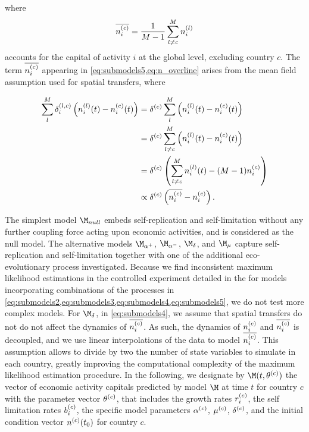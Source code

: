 where 
\begin{equation}\label{eq:n_overline}
      \overline{n_i^{(c)} } = \frac{1}{M-1} \sum_{l \neq c}^M n_{i}^{(l)}
\end{equation}
accounts for the capital of activity $i$ at the global level, excluding country $c$. The term $\overline{n_i^{(c)} }$ appearing in \cref{eq:submodels5,eq:n_overline} arises from the mean field assumption used for spatial transfers, where 

\begin{equation}
  \begin{split}
    \sum_l^M \delta^{(l,c)}_{i} \left( n_i^{(l)}(t) - n_i^{(c)}(t)  \right) &= \delta^{(c)}  \sum_l^M  \left(n_i^{(l)}(t) - n_i^{(c)}(t) \right) \\
    &= \delta^{(c)} \sum_{l \neq c}^M \left(n_i^{(l)}(t) - n_i^{(c)}(t) \right) \\
    &= \delta^{(c)} \left( \sum_{l \neq c}^M n_i^{(l)}(t) - (M - 1) n_i^{(c)} \right) \\
    &\propto \delta^{(c)} \left( \overline{n_i^{(c)} } - n_i^{(c)} \right).
  \end{split}
\end{equation}

The simplest model $\modnull$ embeds self-replication and self-limitation without any further coupling force acting upon economic activities, and is considered as the null model.
% 
The alternative models $\modalphap$, $\modalphan$, $\moddelta$, and $\modmu$ capture self-replication and self-limitation together with one of the additional eco-evolutionary process investigated.
% 
Because we find inconsistent maximum likelihood estimations in the controlled experiment detailed in the  for models incorporating combinations of the processes in \cref{eq:submodels2,eq:submodels3,eq:submodels4,eq:submodels5}, we do not test more complex models.
% 
For $\moddelta$, in \cref{eq:submodels4}, we assume that spatial transfers do not do not affect the dynamics of $\overline{n_i^{(c)}}$. As such, the dynamics of $n_i^{(c)}$ and $\overline{n_i^{(c)}}$ is decoupled, and we use linear interpolations of the data to model $\overline{n_i^{(c)}}$. This assumption allows to divide by two the number of state variables to simulate in each country, greatly improving the computational complexity of the maximum likelihood estimation procedure.
% 
In the following, we designate by $\M(t,\theta\hc )$ the vector of economic activity capitals predicted by model $\M$ at time $t$ for country $c$ with the parameter vector $\theta^{(c)}$, that includes the growth rates $r_i^{(c)} $, the self limitation rates $b_i^{(c)}$, the specific model parameters $\alpha^{(c)}$, $\mu^{(c)}$, $\delta^{(c)}$, and the initial condition vector $n^{(c)} (t_0)$ for country $c$.

